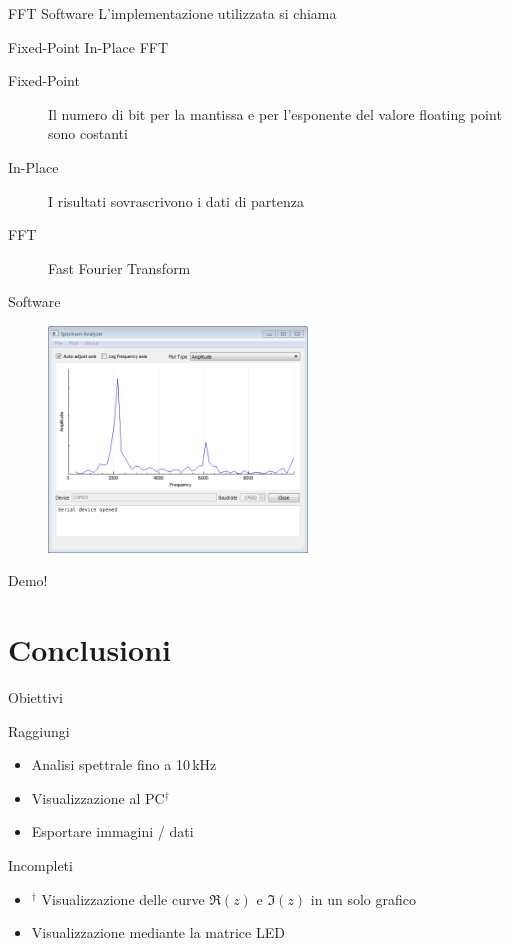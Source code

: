 \documentclass[10pt, xetex]{beamer}
\begin{document}
\begin{frame}{FFT Software}
    L'implementazione utilizzata si chiama
    \vfill
    \begin{center}
        \Large Fixed-Point In-Place FFT
    \end{center}
    \vfill
    \begin{description}
        \item [Fixed-Point] Il numero di bit per la mantissa e per
            l'esponente del valore floating point sono costanti
        \item [In-Place] I risultati sovrascrivono i dati di partenza
        \item [FFT] Fast Fourier Transform
    \end{description}
\end{frame}

\begin{frame}{Software}
    \begin{figure} \centering
        \includegraphics[height=6cm]{figures/screenshots/desktop-windows7-square}
    \end{figure}
    \begin{center}
        \LARGE Demo!
    \end{center}
\end{frame}

\section{Conclusioni}
\begin{frame}{Obiettivi}
    \begin{block}{Raggiungi}
    \begin{itemize}
        \item Analisi spettrale fino a 10\,kHz
        \item Visualizzazione al PC\(^\dagger\)
        \item Esportare immagini / dati
    \end{itemize}
    \end{block}
    \pause

    \begin{block}{Incompleti}
    \begin{itemize}
        \item \(^\dagger\) Visualizzazione delle curve \(\Re(z)\) e \(\Im(z)\) in un solo grafico
        \item Visualizzazione mediante la matrice LED
    \end{itemize}
    \end{block}
\end{frame}
\end{document}
